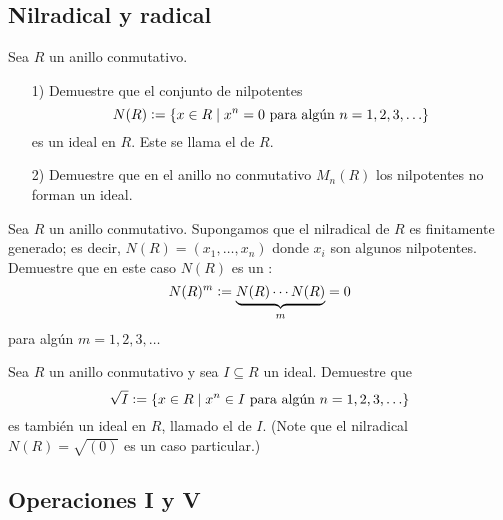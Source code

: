 \subsection*{Nilradical y radical}

\begin{ejercicio}
  Sea $R$ un anillo conmutativo.

  \begin{enumerate}
  \item[1)] Demuestre que el conjunto de nilpotentes
    $$N (R) \mathrel{\mathop:}= \{ x\in R \mid x^n = 0\text{ para algún }n = 1,2,3,\ldots \}$$
    es un ideal en $R$. Este se llama el  de $R$.

  \item[2)] Demuestre que en el anillo no conmutativo $M_n (R)$ los nilpotentes
    no forman un ideal.
  \end{enumerate}
\end{ejercicio}

\begin{ejercicio}
  Sea $R$ un anillo conmutativo. Supongamos que el nilradical de $R$
  es finitamente generado; es decir, $N (R) = (x_1,\ldots,x_n)$ donde $x_i$
  son algunos nilpotentes. Demuestre que en este caso $N (R)$ es
  un :
  $$N (R)^m \mathrel{\mathop:}= \underbrace{N (R)\cdots N (R)}_m = 0$$
  para algún $m = 1,2,3,\ldots$
\end{ejercicio}

\begin{ejercicio}
  Sea $R$ un anillo conmutativo y sea $I \subseteq R$ un ideal. Demuestre que
  \[ \sqrt{I} \mathrel{\mathop:}=
     \{ x\in R \mid x^n \in I \text{ para algún }n = 1,2,3,\ldots \} \]
  es también un ideal en $R$, llamado el  de $I$.
  (Note que el nilradical $N (R) = \sqrt{(0)}$ es un caso particular.)
\end{ejercicio}

\subsection*{Operaciones I y V}

